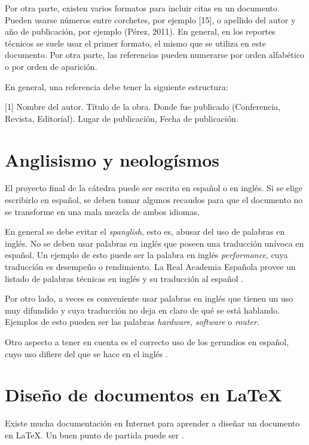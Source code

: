\documentclass{article}
\begin{document}
Por otra parte, existen varios formatos para incluir citas en un documento. Pueden usarse números entre corchetes, por ejemplo [15], o apellido del autor y año de publicación, por ejemplo (Pérez, 2011). En general, en los reportes técnicos se suele usar el primer formato, el mismo que se utiliza en este documento. Por otra parte, las referencias pueden numerarse por orden alfabético o por orden de aparición.

En general, una referencia debe tener la siguiente estructura:

[1] Nombre del autor. Título de la obra. Donde fue publicado (Conferencia, Revista, Editorial). Lugar de publicación, Fecha de publicación. 

\section{Anglisismo y neologísmos}

El proyecto final de la cátedra puede ser escrito en español o en inglés. Si se elige escribirlo en español, se deben tomar algunos recaudos para que el documento no se transforme en una mala mezcla de ambos idiomas.

En general se debe evitar el \emph{spanglish}, esto es, abusar del uso de palabras en inglés. No se deben usar palabras en inglés que poseen una traducción unívoca en español. Un ejemplo de esto puede ser la palabra en inglés \emph{performance}, cuya traducción es desempeño o rendimiento. La Real Academia Española provee un listado de palabras técnicas en inglés y su traducción al español \cite{Rae2019}.

Por otro lado, a veces es conveniente usar palabras en inglés que tienen un uso muy difundido y cuya traducción no deja en claro de qué se está hablando. Ejemplos de esto pueden ser las palabras \emph{hardware}, \emph{software} o \emph{router}. 

Otro aspecto a tener en cuenta es el correcto uso de los gerundios en español, cuyo uso difiere del que se hace en el inglés \cite{Mandado}.

\section{Diseño de documentos en \LaTeX}

Existe mucha documentación en Internet para aprender a diseñar un documento en \LaTeX. Un buen punto de partida puede ser \cite{Latexbook}.
\end{document}
